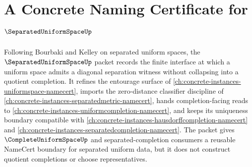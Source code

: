 \chapter{A Concrete Naming Certificate for $\SeparatedUniformSpaceUp$}
\label{ch:concrete-instances-separated-uniform-space-namecert}

Following Bourbaki and Kelley on separated uniform spaces, the $\SeparatedUniformSpaceUp$ packet records the finite interface at which a uniform space admits a diagonal separation witness without collapsing into a quotient completion. It refines the entourage surface of \autoref{ch:concrete-instances-uniformspace-namecert}, imports the zero-distance classifier discipline of \autoref{ch:concrete-instances-separatedmetric-namecert}, hands completion-facing reads to \autoref{ch:concrete-instances-uniformcompletion-namecert}, and keeps its uniqueness boundary compatible with \autoref{ch:concrete-instances-hausdorffcompletion-namecert} and \autoref{ch:concrete-instances-separatedcompletion-namecert}. The packet gives $\CompleteUniformSpaceUp$ and separated-completion consumers a reusable NameCert boundary for separated uniform data, but it does not construct quotient completions or choose representatives.

